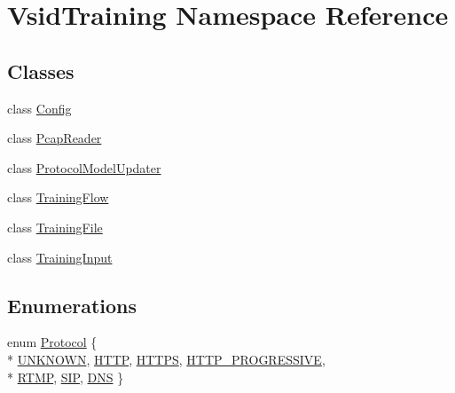 \hypertarget{namespace_vsid_training}{\section{Vsid\-Training Namespace Reference}
\label{namespace_vsid_training}
}
\subsection*{Classes}
\begin{DoxyCompactItemize}
\item 
class \hyperlink{class_vsid_training_1_1_config}{Config}
\item 
class \hyperlink{class_vsid_training_1_1_pcap_reader}{Pcap\-Reader}
\item 
class \hyperlink{class_vsid_training_1_1_protocol_model_updater}{Protocol\-Model\-Updater}
\item 
class \hyperlink{class_vsid_training_1_1_training_flow}{Training\-Flow}
\item 
class \hyperlink{class_vsid_training_1_1_training_file}{Training\-File}
\item 
class \hyperlink{class_vsid_training_1_1_training_input}{Training\-Input}
\end{DoxyCompactItemize}
\subsection*{Enumerations}
\begin{DoxyCompactItemize}
\item 
enum \hyperlink{namespace_vsid_training_a3bd76b3dc03035a8bde253556505b46a}{Protocol} \{ \\*
\hyperlink{namespace_vsid_training_a3bd76b3dc03035a8bde253556505b46aae9b392da625bf1bf9f2d738a4bc6bdb0}{U\-N\-K\-N\-O\-W\-N}, 
\hyperlink{namespace_vsid_training_a3bd76b3dc03035a8bde253556505b46aae5aecfb95a1d758600dd6a6473906681}{H\-T\-T\-P}, 
\hyperlink{namespace_vsid_training_a3bd76b3dc03035a8bde253556505b46aab4267ac049308009d56315c598568c4f}{H\-T\-T\-P\-S}, 
\hyperlink{namespace_vsid_training_a3bd76b3dc03035a8bde253556505b46aa1988196dd91b28ee5d5f2d84bf5fe263}{H\-T\-T\-P\-\_\-\-P\-R\-O\-G\-R\-E\-S\-S\-I\-V\-E}, 
\\*
\hyperlink{namespace_vsid_training_a3bd76b3dc03035a8bde253556505b46aa4a08dc49017154b0e5fb445f52b28949}{R\-T\-M\-P}, 
\hyperlink{namespace_vsid_training_a3bd76b3dc03035a8bde253556505b46aa19ee581751a032455b9d4e21438cdc9b}{S\-I\-P}, 
\hyperlink{namespace_vsid_training_a3bd76b3dc03035a8bde253556505b46aaac16bcce8fb8a2ee2c37e66a293b2788}{D\-N\-S}
 \}
\end{DoxyCompactItemize}


